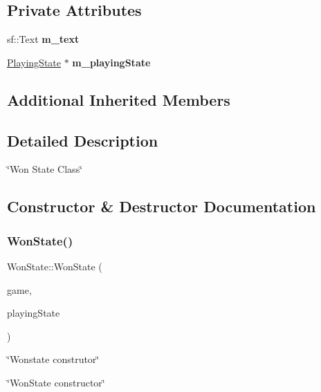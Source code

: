 \subsection*{Private Attributes}
\begin{DoxyCompactItemize}
\item 
\mbox{\label{classWonState_a76c26653a6f745480b75e2781da8051d}} 
sf\+::\+Text {\bfseries m\+\_\+text}
\item 
\mbox{\label{classWonState_a7afc85802a4fce7fb74028841183d424}} 
\hyperlink{classPlayingState}{Playing\+State} $\ast$ {\bfseries m\+\_\+playing\+State}
\end{DoxyCompactItemize}
\subsection*{Additional Inherited Members}


\subsection{Detailed Description}
\char`\"{}\+Won State Class\char`\"{} 

\subsection{Constructor \& Destructor Documentation}
\mbox{\label{classWonState_aec908e9c1dadd32d8efd8266010ec324}} 
\subsubsection{\texorpdfstring{Won\+State()}{WonState()}}
{\footnotesize\ttfamily Won\+State\+::\+Won\+State (\begin{DoxyParamCaption}\item[{\hyperlink{classGame}{Game} $\ast$}]{game,  }\item[{\hyperlink{classGameState}{Game\+State} $\ast$}]{playing\+State }\end{DoxyParamCaption})}



\char`\"{}\+Wonstate construtor\char`\"{} 

\char`\"{}\+Won\+State constructor\char`\"{}


